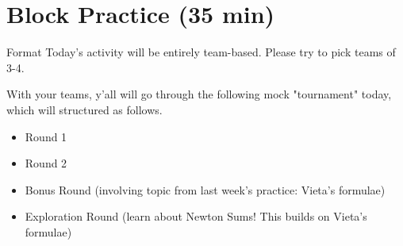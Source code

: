 \documentclass[aspectratio=169,xcolor=dvipsnames]{beamer}
\begin{document}
% 
% 

\section{Block Practice (35 min)}

\begin{frame}[t]{Format}
    Today's activity will be entirely team-based. Please try to pick teams of 3-4. 
    
    \vspace{1em}
    
    With your teams, y'all will go through the following mock "tournament" today, which will structured as follows.
    \vspace{1.5em}
    \begin{itemize}
        \setlength\itemsep{1em}
        \item Round 1
        \item Round 2
        \item Bonus Round (involving topic from last week's practice: Vieta's formulae)
        \item Exploration Round (learn about Newton Sums! This builds on Vieta's formulae)
    \end{itemize}
\end{frame}
\end{document}
